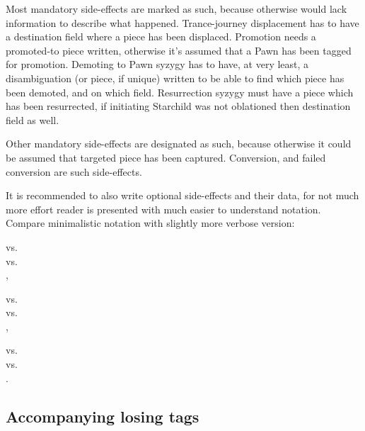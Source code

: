 Most mandatory side-effects are marked as such, because otherwise  would lack information
to describe what happened. Trance-journey displacement has to have a destination field where a piece
has been displaced. Promotion needs a promoted-to piece written, otherwise it's assumed that a Pawn
has been tagged for promotion. Demoting to Pawn syzygy has to have, at very least, a disambiguation
(or piece, if unique) written to be able to find which piece has been demoted, and on which field.
Resurrection syzygy must have a piece which has been resurrected, if initiating Starchild was not
oblationed then destination field as well.

Other mandatory side-effects are designated as such, because otherwise it could be assumed that
targeted piece has been captured. Conversion, and failed conversion are such side-effects.

It is recommended to also write optional side-effects and their data, for not much more effort
reader is presented with much easier to understand notation. Compare minimalistic notation with
slightly more verbose version:

\noindent
{} vs. \\
 vs. \\
,

\noindent
{} vs. \\
 vs. \\
,

\noindent
{} vs. \\
 vs. \\
.

\subsection*{Accompanying losing tags}
\label{sec:Appendix/Summary/Accompanying-losing-tags}

